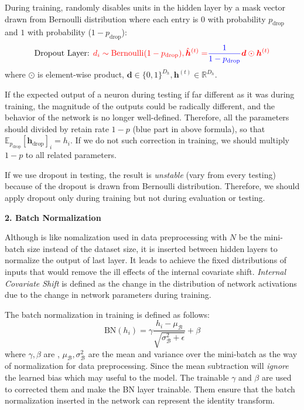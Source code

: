 During training,   randomly disables units in the hidden layer by a mask vector drawn from Bernoulli distribution where each entry is $0$ with probability $p_{\text{drop}}$ and $1$ with probability ($1 − p_{\text{drop}}$):
\begin{equation}
\text{Dropout Layer: } \textcolor{red}{d_i \sim \text{Bernoulli}(1 - p_{\text{drop}}), \hat{\bm{h}}^{(t)} = } \textcolor{blue}{\frac{1}{1-p_{\text{drop}}}} \textcolor{red}{\bm{d} \odot \bm{h}^{(t)}}
\end{equation}
where $\odot$ is element-wise product, $\bm{d} \in \{0, 1\}^{D_h}, \bm{h}^{(t)} \in \mathbb{R}^{D_h}$.

If the expected output of a neuron during testing if far different as it was during training, the magnitude of the outputs could be radically different, and the behavior of the network is no longer well-defined.
Therefore, all the parameters should divided by retain rate $1-p$ (blue part in above formula), so that $\mathbb{E}_{p_{\text{drop}}} [\bm{h}_{\text{drop}}]_i = h_i$.
If we do not such correction in training, we should multiply $1-p$ to all related parameters.

If we use dropout in testing, the result is \emph{unstable} (vary from every testing) because of the
dropout is drawn from Bernoulli distribution.
Therefore, we should apply dropout only during training but not during evaluation or testing.

\textbf{2. Batch Normalization}

Although   is like nomalization used in data preprocessing with $N$ be the mini-batch size instead of the dataset size, it is inserted between hidden layers to normalize the output of last layer.
It leads to achieve the fixed distributions of inputs that would remove the ill effects of the internal covariate shift.
\emph{Internal Covariate Shift} is defined as the change in the distribution of network activations due to the change in network parameters during training.

The batch normalization in training is defined as follows:
\begin{equation}
\text{BN}(h_i) = \gamma \frac{h_i - \mu_{\mathcal{B}}}{\sqrt{\sigma_{\mathcal{B}}^2 + \epsilon}} + \beta
\end{equation}
where $\gamma, \beta$ are , $\mu_{\mathcal{B}}, \sigma_{\mathcal{B}}^2$ are the mean and variance over the mini-batch as the way of normalization for data preprocessing.
Since the mean subtraction will \emph{ignore} the learned bias which may useful to the model.
The trainable $\gamma$ and $\beta$ are used to corrected them and make the BN layer trainable.
Them ensure that the batch normalization inserted in the network can represent the identity transform.


